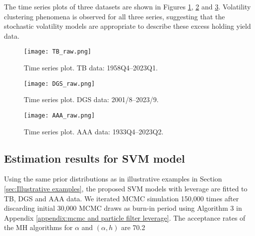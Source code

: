 The time series plots of three datasets are shown in Figures \ref{fig:TB_raw}, \ref{fig:DGS_raw} and \ref{fig:AAA_raw}. Volatility clustering phenomena is observed for all three series, suggesting that the stochastic volatility models are appropriate to describe these excess holding yield data.

\begin{figure}[H]
    \centering
    \texttt{[image: TB\_raw.png]}
    \caption{Time series plot. TB data: 1958Q4--2023Q1.}
    \label{fig:TB_raw}
\end{figure}
\begin{figure}[H]
    \centering
    \texttt{[image: DGS\_raw.png]}
    \caption{Time series plot. DGS data: 2001/8--2023/9.}
    \label{fig:DGS_raw}
\end{figure}
\begin{figure}[H]
    \centering
    \texttt{[image: AAA\_raw.png]}
    \caption{Time series plot. AAA data: 1933Q4--2023Q2.}
    \label{fig:AAA_raw}
\end{figure}

\subsection{Estimation results for SVM model}
\label{sec:Estimation results for SVM model}
Using the same prior distributions as in illustrative examples in Section \ref{sec:Illustrative examples}, the proposed SVM models with leverage are fitted to TB, DGS and AAA data.  
We iterated MCMC simulation 150,000 times after discarding initial 30,000 MCMC draws as burn-in period using Algorithm 3 in Appendix \ref{appendix:mcmc and particle filter leverage}. The acceptance rates of the MH algorithms for $\alpha$ and $(\alpha, h)$ are 70.2\

